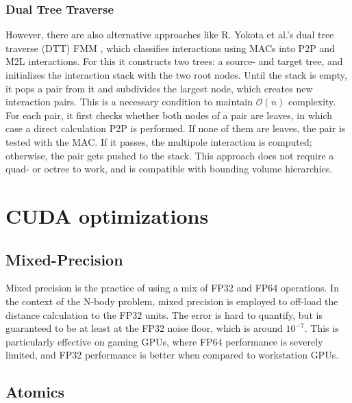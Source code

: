 \subsubsection{Dual Tree Traverse}
\label{sec:optimization-techniques-nbody-fmm-dtt}

However, there are also alternative approaches like R. Yokota et al.'s dual tree traverse (DTT) FMM \cite{yokota2012hierarchical, yokota2013dualtree}, which classifies interactions using MACs into P2P and M2L interactions.
For this it constructs two trees: a source- and target tree, and initializes the interaction stack with the two root nodes.
Until the stack is empty, it pops a pair from it and subdivides the largest node, which creates new interaction pairs. 
This is a necessary condition to maintain \(\mathcal{O}(n)\) complexity.
For each pair, it first checks whether both nodes of a pair are leaves, in which case a direct calculation P2P is performed.
If none of them are leaves, the pair is tested with the MAC.
If it passes, the multipole interaction is computed; otherwise, the pair gets pushed to the stack.
This approach does not require a quad- or octree to work, and is compatible with bounding volume hierarchies.

\section{CUDA optimizations}
\label{sec:optimization-techniques-cuda-optimizations}

\subsection{Mixed-Precision}
\label{sec:optimization-techniques-cuda-optimizations-mixed-precision}

Mixed precision is the practice of using a mix of FP32 and FP64 operations.
In the context of the N-body problem, mixed precision is employed to off-load the distance calculation to the FP32 units.
The error is hard to quantify, but is guaranteed to be at least at the FP32 noise floor, which is around $10^{-7}$.
This is particularly effective on gaming GPUs, where FP64 performance is severely limited, and FP32 performance is better when compared to workstation GPUs.

\subsection{Atomics}
\label{sec:optimization-techniques-cuda-optimizations-atomics}

